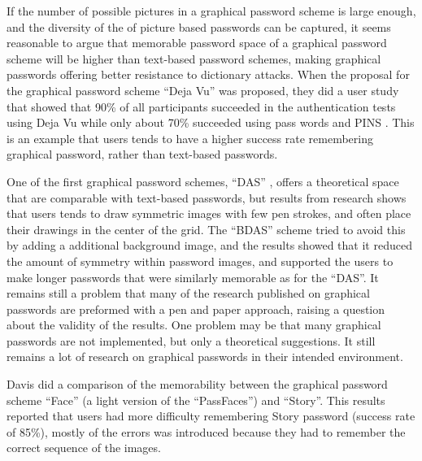   If the number of possible pictures in a graphical password scheme is large enough, and the diversity of the of picture based passwords can be captured, it seems reasonable to argue that memorable password space of a graphical password scheme will be higher than text-based password schemes, making graphical passwords offering better resistance to dictionary attacks.
  When the proposal for the graphical password scheme ``Deja Vu'' was proposed, they did a user study that showed that 90\% of all participants succeeded in the authentication tests using Deja Vu while only about 70\% succeeded using pass words and PINS \cite{DejaVu}. This is an example that users tends to have a higher success rate remembering graphical password, rather than text-based passwords. 

  One of the first graphical password schemes, ``DAS'' \cite{Jermyn}, offers a theoretical space that are comparable with text-based passwords, but results from research shows that users tends to draw symmetric images with few pen strokes, and often place their drawings in the center of the grid. The ``BDAS'' scheme \cite{BDAS} tried to avoid this by adding a additional background image, and the results showed that it reduced the amount of symmetry within password images, and supported the users to make longer passwords that were similarly memorable as for the ``DAS''. It remains still a problem that many of the research published on graphical passwords are preformed with a pen and paper approach, raising a question about the validity of the results. One problem may be that many graphical passwords are not implemented, but only a theoretical suggestions. It still remains a lot of research on graphical passwords in their intended environment. 

  Davis \cite{Davis} did a comparison of the memorability between the graphical password scheme ``Face'' (a light version of the ``PassFaces'') and ``Story''. This results reported that users had more difficulty remembering Story password (success rate of 85\%), mostly of the errors was introduced because they had to remember the correct sequence of the images. 

